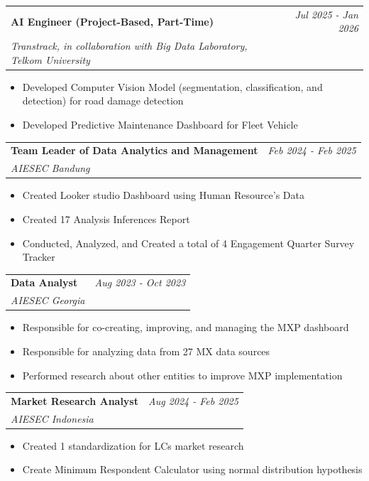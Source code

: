 \documentclass[a4paper,11pt]{article}
\makeatletter
\newcommand{\resumeSubheading}[4]{
\vspace{0.5mm}\item
    \begin{tabular*}{0.98\textwidth}[t]{l@{\extracolsep{\fill}}r}
        \textbf{#1} & \textit{\footnotesize{#4}} \\
        \textit{\footnotesize{#3}} &  \footnotesize{#2}\\
    \end{tabular*}
    \vspace{-2.4mm}
}
\newcommand{\resumeItemListStart}{\begin{justify}\begin{itemize}[leftmargin=3ex, rightmargin=2ex, noitemsep,labelsep=1.2mm,itemsep=0mm]\small}
\newcommand{\resumeItemListEnd}{\end{itemize}\end{justify}\vspace{-2mm}}
\makeatother
\begin{document}
    \resumeSubheading
      {AI Engineer (Project-Based, Part-Time)}{}
      {Transtrack, in collaboration with Big Data Laboratory, Telkom University}{Jul 2025 - Jan 2026}
      \vspace{-2.0mm}
      
      \resumeItemListStart
    \item {Developed Computer Vision Model (segmentation, classification, and detection) for road damage detection}
    \item {Developed Predictive Maintenance Dashboard for Fleet Vehicle}
    \resumeItemListEnd
\vspace{-3.0mm}

    \resumeSubheading
      {Team Leader of Data Analytics and Management}{}
      {AIESEC Bandung}{Feb 2024 - Feb 2025}
      \vspace{-2.0mm}
      
      \resumeItemListStart
    \item {Created Looker studio Dashboard using Human Resource's Data}
    \item {Created 17 Analysis Inferences Report}
    \item {Conducted, Analyzed, and Created a total of 4 Engagement Quarter Survey Tracker}
    \resumeItemListEnd
    
    \vspace{-3.0mm}

    \resumeSubheading
      {Data Analyst}{}
      {AIESEC Georgia}{Aug 2023 - Oct 2023}
      \vspace{-2.0mm}
      
      \resumeItemListStart
    \item {Responsible for co-creating, improving, and managing the MXP dashboard}
    \item {Responsible for analyzing data from 27 MX data sources}
    \item {Performed research about other entities to improve MXP implementation}
    \resumeItemListEnd
    
    \vspace{-3.0mm}

    \resumeSubheading
      {Market Research Analyst}{}
      {AIESEC Indonesia}{Aug 2024 - Feb 2025}
      \vspace{-2.0mm}
      
      \resumeItemListStart
    \item {Created 1 standardization for LCs market research}
    \item {Create Minimum Respondent Calculator using normal distribution hypothesis}
    \resumeItemListEnd
    
\end{document}
